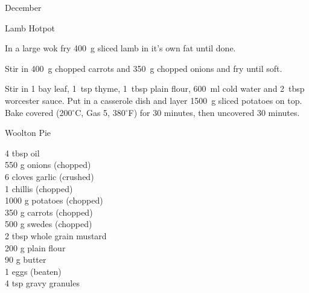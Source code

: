 \begin{menu}{December}
\begin{recipe}{2}{Lamb Hotpot}
\begin{ingredients}
		\end{ingredients}
	
	
    \begin{instructions}
    \item 
        In a large wok fry
        400~g sliced lamb
        in it's own fat until done.
      \item 
        Stir in
        400~g chopped carrots
        and
        350~g chopped onions
        and fry until soft.
      \item 
        Stir in
        1  bay leaf,
        1~tsp  thyme,
        1~tbsp  plain flour,
        600~ml  cold water
        and
        2~tbsp  worcester sauce.
        Put in a casserole dish and
        layer 1500~g sliced potatoes on top.
        Bake covered (200$^{\circ}$C, Gas 5, 380$^{\circ}$F)
        for 30 minutes,
        then uncovered 30 minutes.
      
    \end{instructions}
    \end{recipe}%
  
    \begin{recipe}{2}{Woolton Pie}%
		\begin{ingredients}
		4 tbsp oil  \\
	550 g onions (chopped) \\
	6 cloves garlic (crushed) \\
	1  chillis (chopped) \\
	1000 g potatoes (chopped) \\
	350 g carrots (chopped) \\
	500 g swedes (chopped) \\
	2 tbsp whole grain mustard  \\
	200 g plain flour  \\
	90 g butter  \\
	1  eggs (beaten) \\
	4 tsp gravy granules  \\
	
		\end{ingredients}
	
	

\end{recipe}
\end{menu}
